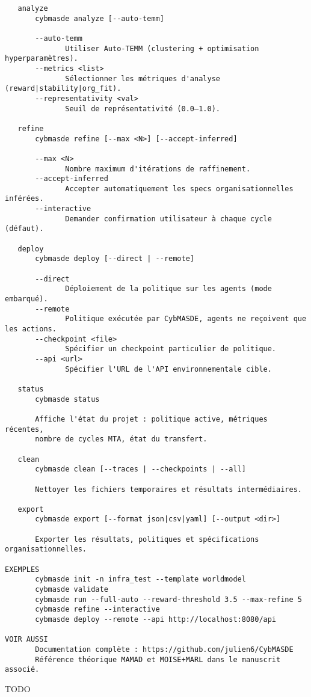 \begin{verbatim}
   analyze
       cybmasde analyze [--auto-temm]

       --auto-temm
              Utiliser Auto-TEMM (clustering + optimisation hyperparamètres).
       --metrics <list>
              Sélectionner les métriques d'analyse (reward|stability|org_fit).
       --representativity <val>
              Seuil de représentativité (0.0–1.0).

   refine
       cybmasde refine [--max <N>] [--accept-inferred]

       --max <N>
              Nombre maximum d'itérations de raffinement.
       --accept-inferred
              Accepter automatiquement les specs organisationnelles inférées.
       --interactive
              Demander confirmation utilisateur à chaque cycle (défaut).

   deploy
       cybmasde deploy [--direct | --remote]

       --direct
              Déploiement de la politique sur les agents (mode embarqué).
       --remote
              Politique exécutée par CybMASDE, agents ne reçoivent que les actions.
       --checkpoint <file>
              Spécifier un checkpoint particulier de politique.
       --api <url>
              Spécifier l'URL de l'API environnementale cible.

   status
       cybmasde status

       Affiche l'état du projet : politique active, métriques récentes,
       nombre de cycles MTA, état du transfert.

   clean
       cybmasde clean [--traces | --checkpoints | --all]

       Nettoyer les fichiers temporaires et résultats intermédiaires.

   export
       cybmasde export [--format json|csv|yaml] [--output <dir>]

       Exporter les résultats, politiques et spécifications organisationnelles.

EXEMPLES
       cybmasde init -n infra_test --template worldmodel
       cybmasde validate
       cybmasde run --full-auto --reward-threshold 3.5 --max-refine 5
       cybmasde refine --interactive
       cybmasde deploy --remote --api http://localhost:8080/api

VOIR AUSSI
       Documentation complète : https://github.com/julien6/CybMASDE
       Référence théorique MAMAD et MOISE+MARL dans le manuscrit associé.
\end{verbatim}

TODO